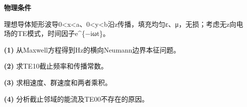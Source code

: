 \textbf{物理条件}\par 理想导体矩形波导0<x<a、0<y<b沿z传播，填充均匀ε、μ，无损；考虑无z向电场的TE模式，时间因子e\textasciicircum{}\{−iωt\}。
\par\noindent\textbf{(1)} 从Maxwell方程得到Hz的横向Neumann边界本征问题。
\par\noindent\textbf{(2)} 求TE10截止频率和传播常数。
\par\noindent\textbf{(3)} 求相速度、群速度和两者乘积。
\par\noindent\textbf{(4)} 分析截止邻域的能流及TE00不存在的原因。

